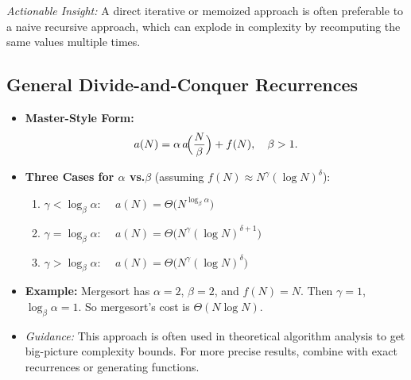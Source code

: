 \documentclass[11pt,letterpaper]{article}
\begin{document}
\noindent
\emph{Actionable Insight:} A direct iterative or memoized approach is often preferable to a naive recursive approach, which can explode in complexity by recomputing the same values multiple times.

\subsection{General Divide-and-Conquer Recurrences}
\begin{itemize}
  \item \textbf{Master-Style Form:} 
    \[
      a(N) = \alpha\,a\!\Bigl(\frac{N}{\beta}\Bigr) + f(N),
      \quad \beta > 1.
    \]
  \item \textbf{Three Cases for \(\alpha\) vs.\(\beta\)} (assuming \(f(N) \approx N^\gamma(\log N)^\delta\)):
    \begin{enumerate}
      \item \(\gamma < \log_\beta \alpha\): \(\quad a(N) = \Theta\bigl(N^{\log_\beta \alpha}\bigr)\)
      \item \(\gamma = \log_\beta \alpha\): \(\quad a(N) = \Theta\bigl(N^\gamma (\log N)^{\delta+1}\bigr)\)
      \item \(\gamma > \log_\beta \alpha\): \(\quad a(N) = \Theta\bigl(N^\gamma (\log N)^\delta\bigr)\)
    \end{enumerate}
  \item \textbf{Example:} Mergesort has \(\alpha=2\), \(\beta=2\), and \(f(N)=N\). Then \(\gamma=1\), \(\log_\beta \alpha = 1\). So mergesort’s cost is \(\Theta(N \log N)\).
  \item \emph{Guidance:} This approach is often used in theoretical algorithm analysis to get big-picture complexity bounds. For more precise results, combine with exact recurrences or generating functions.
\end{itemize}

\end{document}
